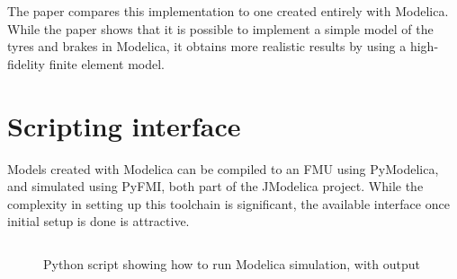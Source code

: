 \documentclass[\rootfolder/main.tex]{subfiles}
\begin{document}
The paper compares this implementation to one created entirely with Modelica.
While the paper shows that it is possible to implement a simple model of the tyres and brakes in Modelica, it obtains more realistic results by using a high-fidelity finite element model.

\section{Scripting interface}

Models created with Modelica can be compiled to an FMU using PyModelica, and simulated using PyFMI, both part of the JModelica project.
While the complexity in setting up this toolchain is significant, the available interface once initial setup is done is attractive.

\begin{figure}[ht]
	\begin{minipage}[c]{.5\columnwidth}
	\end{minipage}%
	\begin{minipage}[c]{.5\columnwidth}
        \inputminted[fontsize=\footnotesize]{Python}{\rootfolder/Chapters/Chapter2/Listings/simulate.py}
	\end{minipage}
    \caption{Python script showing how to run Modelica simulation, with output}
\end{figure}
\end{document}
